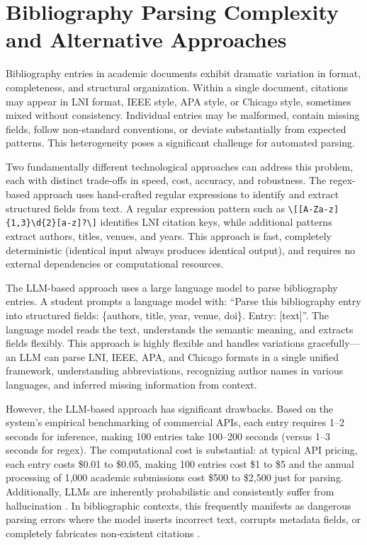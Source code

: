 \documentclass[12pt,a4paper,oneside]{report}
\begin{document}
\section{Bibliography Parsing Complexity and Alternative Approaches}

Bibliography entries in academic documents exhibit dramatic variation in format, completeness, and structural organization. Within a single document, citations may appear in LNI format, IEEE style, APA style, or Chicago style, sometimes mixed without consistency. Individual entries may be malformed, contain missing fields, follow non-standard conventions, or deviate substantially from expected patterns. This heterogeneity poses a significant challenge for automated parsing.

Two fundamentally different technological approaches can address this problem, each with distinct trade-offs in speed, cost, accuracy, and robustness. The regex-based approach uses hand-crafted regular expressions to identify and extract structured fields from text. A regular expression pattern such as \texttt{\textbackslash[[A-Za-z]\{1,3\}\textbackslash d\{2\}[a-z]?\textbackslash]} identifies LNI citation keys, while additional patterns extract authors, titles, venues, and years. This approach is fast, completely deterministic (identical input always produces identical output), and requires no external dependencies or computational resources.

The LLM-based approach uses a large language model to parse bibliography entries. A student prompts a language model with: ``Parse this bibliography entry into structured fields: \{authors, title, year, venue, doi\}. Entry: [text]''. The language model reads the text, understands the semantic meaning, and extracts fields flexibly. This approach is highly flexible and handles variations gracefully---an LLM can parse LNI, IEEE, APA, and Chicago formats in a single unified framework, understanding abbreviations, recognizing author names in various languages, and inferred missing information from context.

However, the LLM-based approach has significant drawbacks. Based on the system's empirical benchmarking of commercial APIs, each entry requires 1--2 seconds for inference, making 100 entries take 100--200 seconds (versus 1--3 seconds for regex). The computational cost is substantial: at typical API pricing, each entry costs \$0.01 to \$0.05, making 100 entries cost \$1 to \$5 and the annual processing of 1,000 academic submissions cost \$500 to \$2,500 just for parsing. Additionally, LLMs are inherently probabilistic and consistently suffer from hallucination \cite{ji2023survey, walters2023, gravel2023}. In bibliographic contexts, this frequently manifests as dangerous parsing errors where the model inserts incorrect text, corrupts metadata fields, or completely fabricates non-existent citations \cite{alkaissi2023}.
\end{document}

